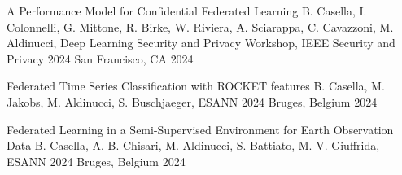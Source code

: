 \begin{cvhonors}
	\cvhonor
    {A Performance Model for Confidential Federated Learning} %
    {B. Casella, I. Colonnelli, G. Mittone, R. Birke, W. Riviera, A. Sciarappa, C. Cavazzoni, M. Aldinucci, Deep Learning Security and Privacy Workshop, IEEE Security and Privacy 2024} %
    {San Francisco, CA} %
    {2024} %

	\cvhonor
    {Federated Time Series Classification with ROCKET features} %
    {B. Casella, M. Jakobs, M. Aldinucci, S. Buschjaeger, ESANN 2024} %
    {Bruges, Belgium} %
    {2024} %

	\cvhonor
    {Federated Learning in a Semi-Supervised Environment for Earth Observation Data} %
    {B. Casella, A. B. Chisari, M. Aldinucci, S. Battiato, M. V. Giuffrida, ESANN 2024} %
    {Bruges, Belgium} %
    {2024} %

\end{cvhonors}





